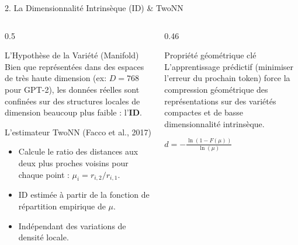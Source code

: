 \documentclass[t, aspectratio=169]{beamer}
\begin{document}
\begin{frame}{2. La Dimensionnalité Intrinsèque (ID) \& TwoNN}
  \begin{columns}[c]
    \begin{column}{0.5\textwidth}
      \begin{block}{L'Hypothèse de la Variété (Manifold)}
        \small
        Bien que représentées dans des espaces de très haute dimension (ex: $D = 768$ pour GPT-2), les données réelles sont confinées sur des structures locales de dimension beaucoup plus faible : l'\textbf{ID}.
      \end{block}
      
      \begin{block}{L'estimateur TwoNN (Facco et al., 2017)}
        \small
        \begin{itemize}
          \item Calcule le ratio des distances aux deux plus proches voisins pour chaque point : $\mu_i = r_{i,2} / r_{i,1}$.
          \item ID estimée à partir de la fonction de répartition empirique de $\mu$.
          \item Indépendant des variations de densité locale.
        \end{itemize}
      \end{block}
    \end{column}
    
    \begin{column}{0.46\textwidth}
      \begin{exampleblock}{Propriété géométrique clé}
        \scriptsize
        L'apprentissage prédictif (minimiser l'erreur du prochain token) force la compression géométrique des représentations sur des variétés compactes et de basse dimensionnalité intrinsèque.
      \end{exampleblock}
      \centering
      \vspace{0.5cm}
      \large $d = - \frac{\ln(1 - F(\mu))}{\ln(\mu)}$
    \end{column}
  \end{columns}
\end{frame}
\end{document}
